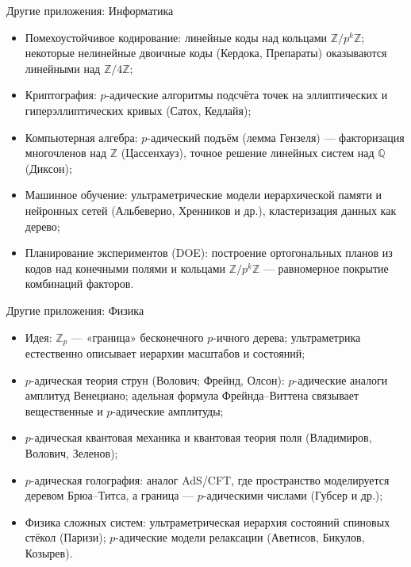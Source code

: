 \documentclass[serif, aspectratio=169]{beamer}
\begin{document}
\begin{frame}{Другие приложения: Информатика}
    \begin{itemize}
        \item Помехоустойчивое кодирование: линейные коды над кольцами $\mathbb{Z}/p^k\mathbb{Z}$; некоторые нелинейные двоичные коды (Кердока, Препараты) оказываются линейными над $\mathbb{Z}/4\mathbb{Z}$;
        \item Криптография: $p$-адические алгоритмы подсчёта точек на эллиптических и гиперэллиптических кривых (Сатох, Кедлайя);
        \item Компьютерная алгебра: $p$-адический подъём (лемма Гензеля) --- факторизация многочленов над $\mathbb{Z}$ (Цассенхауз), точное решение линейных систем над $\mathbb{Q}$ (Диксон);
        \item Машинное обучение: ультраметрические модели иерархической памяти и нейронных сетей (Альбеверио, Хренников и др.), кластеризация данных как дерево;
        \item Планирование экспериментов (DOE): построение ортогональных планов из кодов над конечными полями и кольцами $\mathbb{Z}/p^k\mathbb{Z}$ --- равномерное покрытие комбинаций факторов.
    \end{itemize}
    \note{
        \begin{itemize}
            \item ---
        \end{itemize}
    }
\end{frame}

\begin{frame}{Другие приложения: Физика}
    \begin{itemize}
        \item Идея: $\mathbb{Z}_p$ --- «граница» бесконечного $p$-ичного дерева; ультраметрика естественно описывает иерархии масштабов и состояний;
        \item $p$-адическая теория струн (Волович; Фрейнд, Олсон): $p$-адические аналоги амплитуд Венециано; адельная формула Фрейнда--Виттена связывает вещественные и $p$-адические амплитуды;
        \item $p$-адическая квантовая механика и квантовая теория поля (Владимиров, Волович, Зеленов);
        \item $p$-адическая голография: аналог AdS/CFT, где пространство моделируется деревом Брюа--Титса, а граница --- $p$-адическими числами (Губсер и др.);
        \item Физика сложных систем: ультраметрическая иерархия состояний спиновых стёкол (Паризи); $p$-адические модели релаксации (Аветисов, Бикулов, Козырев).
    \end{itemize}

    \note{
        \begin{itemize}
            \item ---
        \end{itemize}
    }
\end{frame}
\end{document}
